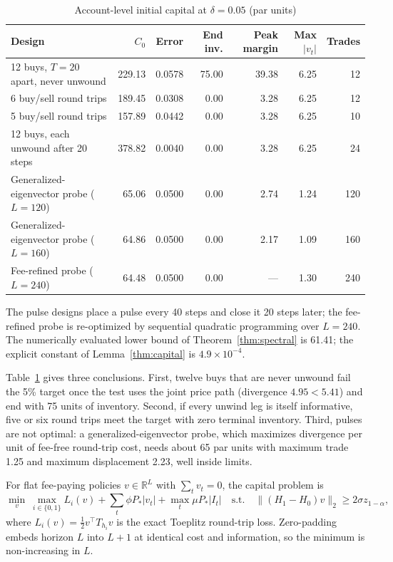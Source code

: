 \documentclass[12pt]{article}
\theoremstyle{definition}
\theoremstyle{remark}
\newcommand{\R}{\mathbb{R}}
\begin{document}
\begin{table}[t]\centering\small
\begin{threeparttable}
\caption{Account-level initial capital at $\delta=0.05$ (par units)}\label{tab:ledger}
\setlength{\tabcolsep}{4pt}
\begin{tabular}{lrrrrrr}
\toprule
Design & $C_0$ & Error & End inv. & Peak margin & Max $|v_t|$ & Trades\\
\midrule
12 buys, $T=20$ apart, never unwound & 229.13 & 0.0578 & 75.00 & 39.38 & 6.25 & 12\\
6 buy/sell round trips & 189.45 & 0.0308 & 0.00 & 3.28 & 6.25 & 12\\
5 buy/sell round trips & 157.89 & 0.0442 & 0.00 & 3.28 & 6.25 & 10\\
12 buys, each unwound after 20 steps & 378.82 & 0.0040 & 0.00 & 3.28 & 6.25 & 24\\
Generalized-eigenvector probe ($L=120$) & 65.06 & 0.0500 & 0.00 & 2.74 & 1.24 & 120\\
Generalized-eigenvector probe ($L=160$) & 64.86 & 0.0500 & 0.00 & 2.17 & 1.09 & 160\\
Fee-refined probe ($L=240$) & 64.48 & 0.0500 & 0.00 & --- & 1.30 & 240\\
\bottomrule
\end{tabular}
\begin{tablenotes}\footnotesize\item The pulse designs place a pulse every 40 steps and close it 20 steps later; the fee-refined probe is re-optimized by sequential quadratic programming over $L=240$. The numerically evaluated lower bound of Theorem~\ref{thm:spectral} is 61.41; the explicit constant of Lemma~\ref{thm:capital} is $4.9\times10^{-4}$.\end{tablenotes}
\end{threeparttable}
\end{table}

Table~\ref{tab:ledger} gives three conclusions. First, twelve buys that are never unwound fail the 5\% target once the test uses the joint price path (divergence $4.95<5.41$) and end with 75 units of inventory. Second, if every unwind leg is itself informative, five or six round trips meet the target with zero terminal inventory. Third, pulses are not optimal: a generalized-eigenvector probe, which maximizes divergence per unit of fee-free round-trip cost, needs about 65 par units with maximum trade 1.25 and maximum displacement 2.23, well inside limits.

For flat fee-paying policies $v\in\R^L$ with $\sum_tv_t=0$, the capital problem is
\begin{equation}\label{eq:capprob}
\min_v\ \max_{i\in\{0,1\}}L_i(v)+\sum_t\phi P_*|v_t|+\max_t\mu P_*|I_t|\quad\text{s.t.}\quad\|(H_1-H_0)v\|_2\ge2\sigma z_{1-\alpha},
\end{equation}
where $L_i(v)=\tfrac12v^\top T_{h_i}v$ is the exact Toeplitz round-trip loss. Zero-padding embeds horizon $L$ into $L+1$ at identical cost and information, so the minimum is non-increasing in $L$.
\end{document}
